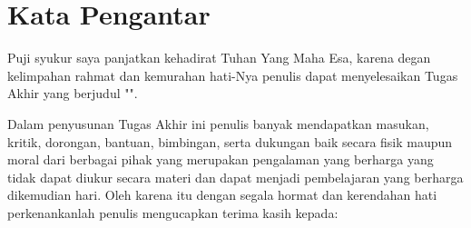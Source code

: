 \chapter*{Kata Pengantar}

Puji syukur saya panjatkan kehadirat Tuhan Yang Maha Esa, karena degan kelimpahan rahmat dan kemurahan hati-Nya penulis dapat menyelesaikan Tugas Akhir yang berjudul "\thetitle".

Dalam penyusunan Tugas Akhir ini penulis banyak mendapatkan masukan, kritik, dorongan, bantuan, bimbingan, serta dukungan baik secara fisik maupun moral dari berbagai pihak yang merupakan pengalaman yang berharga yang tidak dapat diukur secara materi dan dapat menjadi pembelajaran yang berharga dikemudian hari. Oleh karena itu dengan segala hormat dan kerendahan hati perkenankanlah penulis mengucapkan terima kasih kepada:

